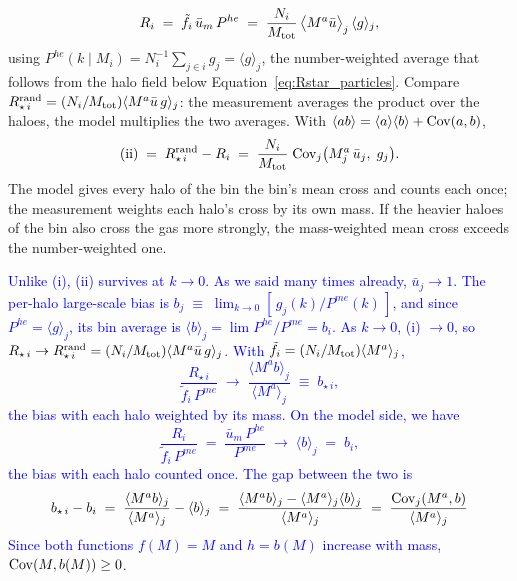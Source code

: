 \documentclass{article}
\begin{document}
\begin{itemize}
{\begin{equation}
    R_i \;=\; \tilde f_i\,\bar u_m\,P^{he} \;=\; \frac{N_i}{M_{\rm tot}}\,
    \big\langle M^a\bar u\big\rangle_j\,\langle g\rangle_j ,
  \end{equation}
  using $P^{he}(k\mid M_i) = N_i^{-1}\sum_{j\in i} g_j = \langle g\rangle_j$, the
  number-weighted average that follows from the halo field below
  Equation~\eqref{eq:Rstar_particles}. Compare $R_{\star\,i}^{\rm rand} =
  (N_i/M_{\rm tot})\langle M^a\bar u\, g\rangle_j$: the measurement averages the product over the haloes, the model
  multiplies the two averages. With $\langle ab\rangle = \langle a\rangle\langle
  b\rangle + {\rm Cov}(a,b)$,
  \begin{equation}
    \text{(ii)} \;=\; R_{\star\,i}^{\rm rand} - R_i \;=\;
    \frac{N_i}{M_{\rm tot}}\;{\rm Cov}_j\big(M_j^a\,\bar u_j,\; g_j\big).
    \label{eq:halo_to_halo}
  \end{equation}
  The model gives every halo of the bin the bin's mean cross and counts each
  once; the measurement weights each halo's cross by its own mass. If the
  heavier haloes of the bin also cross the gas more strongly, the mass-weighted
  mean cross exceeds the number-weighted one.}

  \textcolor{blue}{Unlike (i), (ii) survives
  at $k\to0$. As we said many times already, $\bar u_j \to
  1$. The per-halo large-scale bias is $b_j \;\equiv\; \lim_{k\to0} \left[\,g_j(k) / P^{me}(k) \,\right]$, and since $P^{he} = \langle
  g\rangle_j$, its bin average is $\langle b\rangle_j = \lim P^{he}/P^{me} =
  b_i$. As $k\to0$, (i) $\to0$, so
  $R_{\star\,i} \to R_{\star\,i}^{\rm rand} = (N_i/M_{\rm tot})\langle
  M^a\bar u\,g\rangle_j$. With $\tilde f_i = (N_i/M_{\rm
  tot})\langle M^a\rangle_j$,
  \begin{equation}
    \frac{R_{\star\,i}}{\tilde f_i\,P^{me}} \;\to\;
    \frac{\langle M^a b\rangle_j}{\langle M^a\rangle_j} \;\equiv\; b_{\star\,i},
  \end{equation}
  the bias with each halo weighted by its mass. On the model side, we have
  \begin{equation}
    \frac{R_i}{\tilde f_i\,P^{me}} \;=\; \frac{\bar u_m\,P^{he}}{P^{me}}
    \;\to\; \langle b\rangle_j \;=\; b_i,
  \end{equation}
  the bias with each halo counted once. The gap between the two is
  \begin{equation}
    b_{\star\,i} - b_i \;=\; \frac{\langle M^a b\rangle_j}{\langle M^a\rangle_j}
    - \langle b\rangle_j
    \;=\; \frac{\langle M^a b\rangle_j - \langle M^a\rangle_j\langle b\rangle_j}
               {\langle M^a\rangle_j}
    \;=\; \frac{{\rm Cov}_j(M^a, b)}{\langle M^a\rangle_j}
  \end{equation}
  Since both functions $f(M) = M$ and $h = b(M)$ increase with mass, ${\rm Cov}(M,
  b(M)) \ge 0$.}
\end{itemize}
\end{document}
